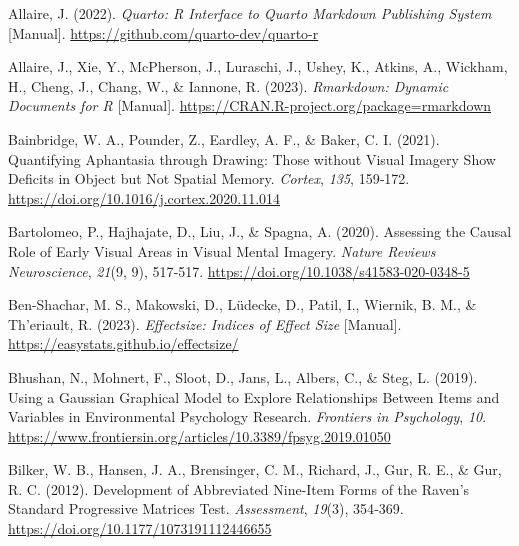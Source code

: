 \documentclass[
  12pt,
]{article}
\newlength{\cslhangindent}
\newlength{\cslentryspacingunit} %
\newenvironment{CSLReferences}[2] %
 {%
  \setlength{\parindent}{0pt}
  \ifodd #1
  \let\oldpar\par
  \def\par{\hangindent=\cslhangindent\oldpar}
  \fi
  \setlength{\parskip}{#2\cslentryspacingunit}
 }%
 {}
\begin{document}
\hypertarget{refs}{}
\begin{CSLReferences}{1}{0}
\leavevmode{}%
Allaire, J. (2022). \emph{Quarto: {R} Interface to Quarto Markdown
Publishing System} {[}Manual{]}.
\url{https://github.com/quarto-dev/quarto-r}

\leavevmode{}%
Allaire, J., Xie, Y., McPherson, J., Luraschi, J., Ushey, K., Atkins,
A., Wickham, H., Cheng, J., Chang, W., \& Iannone, R. (2023).
\emph{Rmarkdown: {Dynamic} Documents for {R}} {[}Manual{]}.
\url{https://CRAN.R-project.org/package=rmarkdown}

\leavevmode{}%
Bainbridge, W. A., Pounder, Z., Eardley, A. F., \& Baker, C. I. (2021).
Quantifying Aphantasia through Drawing: {Those} without Visual Imagery
Show Deficits in Object but Not Spatial Memory. \emph{Cortex},
\emph{135}, 159‑172. \url{https://doi.org/10.1016/j.cortex.2020.11.014}

\leavevmode{}%
Bartolomeo, P., Hajhajate, D., Liu, J., \& Spagna, A. (2020). Assessing
the Causal Role of Early Visual Areas in Visual Mental Imagery.
\emph{Nature Reviews Neuroscience}, \emph{21}(9, 9), 517‑517.
\url{https://doi.org/10.1038/s41583-020-0348-5}

\leavevmode{}%
Ben-Shachar, M. S., Makowski, D., Lüdecke, D., Patil, I., Wiernik, B.
M., \& Th'eriault, R. (2023). \emph{Effectsize: {Indices} of Effect
Size} {[}Manual{]}. \url{https://easystats.github.io/effectsize/}

\leavevmode{}%
Bhushan, N., Mohnert, F., Sloot, D., Jans, L., Albers, C., \& Steg, L.
(2019). Using a {Gaussian Graphical Model} to {Explore Relationships
Between Items} and {Variables} in {Environmental Psychology Research}.
\emph{Frontiers in Psychology}, \emph{10}.
\url{https://www.frontiersin.org/articles/10.3389/fpsyg.2019.01050}

\leavevmode{}%
Bilker, W. B., Hansen, J. A., Brensinger, C. M., Richard, J., Gur, R.
E., \& Gur, R. C. (2012). Development of {Abbreviated Nine-Item Forms}
of the {Raven}'s {Standard Progressive Matrices Test}.
\emph{Assessment}, \emph{19}(3), 354‑369.
\url{https://doi.org/10.1177/1073191112446655}


\end{CSLReferences}
\end{document}
